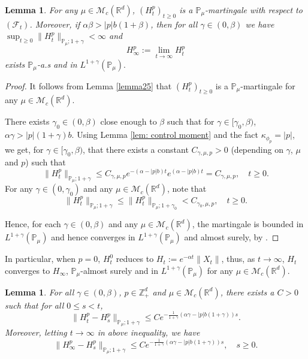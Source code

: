 \documentclass[12pt,a4paper]{amsart}
\theoremstyle{plain}
\newtheorem{lem}[thm]{Lemma}
\theoremstyle{definition}
\numberwithin{equation}{section}
\begin{document}
\begin{lem}\label{lemma26}
    For any $\mu\in \mathcal M_c(\mathbb R^d)$, $(H^p_t)_{t\geq 0}$ is a $\mathbb P_\mu$-martingale with respect to $(\mathscr F_t)$. Moreover, if $\alpha\beta>|p|b(1+\beta)$, then for all $\gamma\in (0, \beta)$ we have $\sup_{t\geq 0}\|H_t^p\|_{\mathbb P_\mu;1+\gamma}< \infty$ and
\[
    H_{\infty}^p
    :=\lim_{t\rightarrow \infty}H_t^p
\]
exists $\mathbb{P}_{\mu}$-a.s and in $L^{1+\gamma}(\mathbb{P}_{\mu}).$
\end{lem}
\begin{proof}
  It follows from Lemma \ref{lemma25} that $(H_t^p)_{t\geq 0}$ is a $\mathbb P_\mu$-martingale for any $\mu\in \mathcal M_c(\mathbb R^d)$.

    There exists $\gamma_0 \in (0,\beta)$ close enough to $\beta$ such that for $\gamma\in [\gamma_0, \beta)$, $\alpha\gamma>|p|(1+\gamma)b$.
    Using  Lemma \ref{lem: control moment} and the fact $\kappa_{\phi_p}=|p|$,
   we get, for $\gamma\in [\gamma_0, \beta)$, that there exists
    a constant $C_{\gamma, \mu, p}>0$ (depending on $\gamma$, $\mu$ and $p$)  such that
\[
 	\|H_t^p\|_{\mathbb P_\mu;1+\gamma}
    \leq C_{\gamma, \mu, p} e^{-(\alpha-|p|b)t}e^{(\alpha-|p|b)t}
    =C_{\gamma, \mu, p}, \quad t\geq 0.
\]
   For any $\gamma\in (0, \gamma_0)$ and any $\mu\in \mathcal M_c(\mathbb R^d)$, note that
\[
	\|H_t^p\|_{\mathbb P_\mu;1+\gamma}
	\leq\|H_t^p\|_{\mathbb P_\mu;1+\gamma_0}
	<C_{\gamma_0, \mu, p},
	\quad t\geq 0.
\]

   Hence, for each $\gamma \in (0,\beta)$ and any $\mu\in \mathcal M_c(\mathbb R^d)$,
    the martingale is bounded in $L^{1+\gamma}(\mathbb{P}_{\mu})$ and hence converges in $L^{1+\gamma}(\mathbb{P}_{\mu}) $ and almost surely, by \cite[Theorem 5.4.5]{Durrett2010Probability}.
\end{proof}

In particular, when $p=0$, $H_t^0$ reduces to $H_t:=e^{-\alpha t}\|X_t\|$, thus, as $t\rightarrow \infty$, $H_t$ converges to $H_{\infty}$, $\mathbb{P}_{\mu}$-almost surely and in $L^{1+\gamma}(\mathbb{P}_{\mu})$  for any $\mu\in \mathcal M_c(\mathbb R^d)$.

\begin{lem}\label{lem: control of wt} For all $\gamma\in (0,\beta)$, $p\in \mathbb{Z}_+^d$ and $\mu\in \mathcal M_c(\mathbb R^d)$, there exists a $C> 0$ such that for all $0\leq s<t$,
\[
    \|H^p_t-H^p_s\|_{\mathbb{P}_{\mu};1+\gamma}
    \leq C e^{-\frac{ 1}{1+\gamma}(\alpha\gamma-|p|b(1+\gamma))s}.
\]
Moreover, letting $t\to\infty$ in above inequality, we have
\[
    \|H^p_\infty-H^p_s\|_{\mathbb{P}_{\mu};1+\gamma}
    \leq C e^{-\frac{ 1}{1+\gamma}(\alpha\gamma-|p|b(1+\gamma))s},\quad s\geq 0.
\]
\end{lem}
\end{document}
